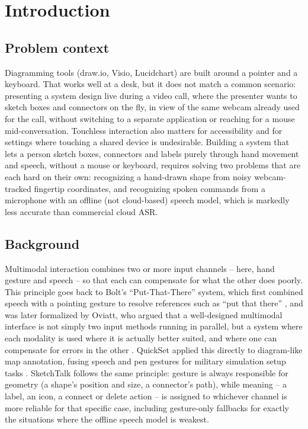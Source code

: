 \documentclass[sigconf]{acmart}
\begin{document}
\maketitle

\section{Introduction}

\subsection{Problem context}
Diagramming tools (draw.io, Visio, Lucidchart) are built around a pointer
and a keyboard. That works well at a desk, but it does not match a common
scenario: presenting a system design live during a video call, where the
presenter wants to sketch boxes and connectors on the fly, in view of the
same webcam already used for the call, without switching to a separate
application or reaching for a mouse mid-conversation. Touchless interaction
also matters for accessibility and for settings where touching a shared
device is undesirable. Building a system that lets a person sketch boxes,
connectors and labels purely through hand movement and speech, without a
mouse or keyboard, requires solving two problems that are each hard on
their own: recognizing a hand-drawn shape from noisy webcam-tracked
fingertip coordinates, and recognizing spoken commands from a microphone
with an offline (not cloud-based) speech model, which is markedly less
accurate than commercial cloud ASR.

\subsection{Background}
Multimodal interaction combines two or more input channels -- here, hand
gesture and speech -- so that each can compensate for what the other does
poorly. This principle goes back to Bolt's ``Put-That-There'' system, which
first combined speech with a pointing gesture to resolve references such as
``put that there'' \cite{bolt1980}, and was later formalized by Oviatt, who
argued that a well-designed multimodal interface is not simply two input
methods running in parallel, but a system where each modality is used where
it is actually better suited, and where one can compensate for errors in
the other \cite{oviatt1999}. QuickSet applied this directly to diagram-like
map annotation, fusing speech and pen gestures for military simulation
setup tasks \cite{cohen1997}. SketchTalk follows the same principle:
gesture is always responsible for geometry (a shape's position and size, a
connector's path), while meaning -- a label, an icon, a connect or delete
action -- is assigned to whichever channel is more reliable for that
specific case, including gesture-only fallbacks for exactly the situations
where the offline speech model is weakest.
\end{document}
